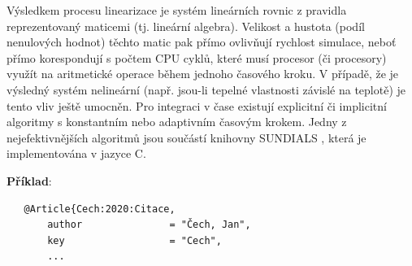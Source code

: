 Výsledkem procesu linearizace je systém lineárních rovnic z pravidla
reprezentovaný maticemi (tj. lineární algebra). Velikost a hustota (podíl
nenulových hodnot) těchto matic pak přímo ovlivňují rychlost simulace, neboť
přímo korespondují s počtem CPU cyklů, které musí procesor (či procesory)
využít na aritmetické operace během jednoho časového kroku. V případě, že je
výsledný systém nelineární (např. jsou-li tepelné vlastnosti závislé na
teplotě) je tento vliv ještě umocněn. Pro integraci v čase existují explicitní
či implicitní algoritmy s konstantním nebo adaptivním časovým krokem. Jedny z
nejefektivnějších algoritmů jsou součástí knihovny SUNDIALS 
, která je implementována v jazyce C.
\label{kapitoly}


\textbf{Příklad}:
\begin{verbatim}
   @Article{Cech:2020:Citace,
	   author               = "Čech, Jan",
	   key                  = "Cech",
	   ... 
\end{verbatim}


